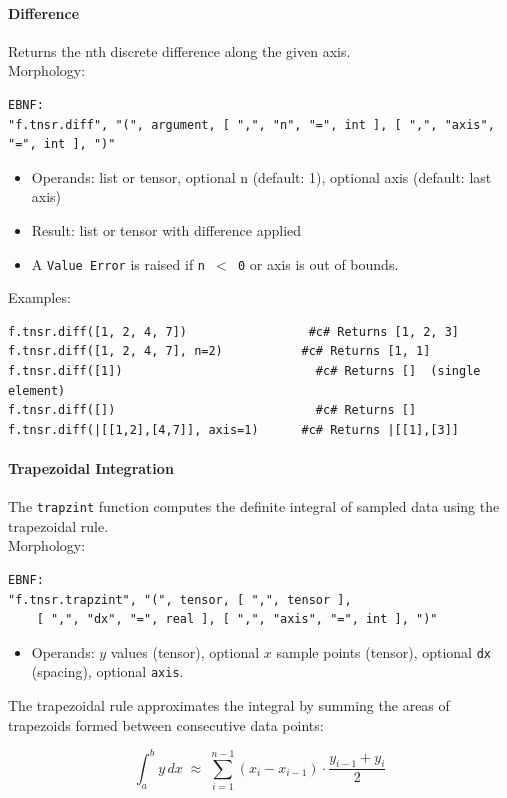 \paragraph{Difference}
Returns the nth discrete difference along the given axis.\\
Morphology:
\begin{verbatim}
EBNF:
"f.tnsr.diff", "(", argument, [ ",", "n", "=", int ], [ ",", "axis", "=", int ], ")"
\end{verbatim}
\begin{itemize}
\item Operands: list or tensor, optional n (default: 1), optional axis (default: last axis)
\item Result: list or tensor with difference applied
\item A \texttt{Value Error} is raised if \texttt{n $<$ 0} or axis is out of bounds.
\end{itemize}
Examples:
\begin{verbatim}
f.tnsr.diff([1, 2, 4, 7])                 #c# Returns [1, 2, 3]
f.tnsr.diff([1, 2, 4, 7], n=2)           #c# Returns [1, 1]
f.tnsr.diff([1])                           #c# Returns []  (single element)
f.tnsr.diff([])                            #c# Returns []
f.tnsr.diff(|[[1,2],[4,7]], axis=1)      #c# Returns |[[1],[3]]
\end{verbatim}

\paragraph{Trapezoidal Integration}
The \texttt{trapzint} function computes the definite integral of sampled data using the trapezoidal rule.\\
Morphology:
\begin{verbatim}
EBNF:
"f.tnsr.trapzint", "(", tensor, [ ",", tensor ],
    [ ",", "dx", "=", real ], [ ",", "axis", "=", int ], ")"
\end{verbatim}
\begin{itemize}
\item Operands: $y$ values (tensor), optional $x$ sample points (tensor), optional \texttt{dx} (spacing), optional \texttt{axis}.
\end{itemize}

The trapezoidal rule approximates the integral by summing the areas of trapezoids formed between consecutive data points:

\begin{equation}
\int_a^b y \, dx \;\approx\; \sum_{i=1}^{n-1} (x_i - x_{i-1}) \cdot \frac{y_{i-1} + y_i}{2}
\label{eq:trapz}
\end{equation}

